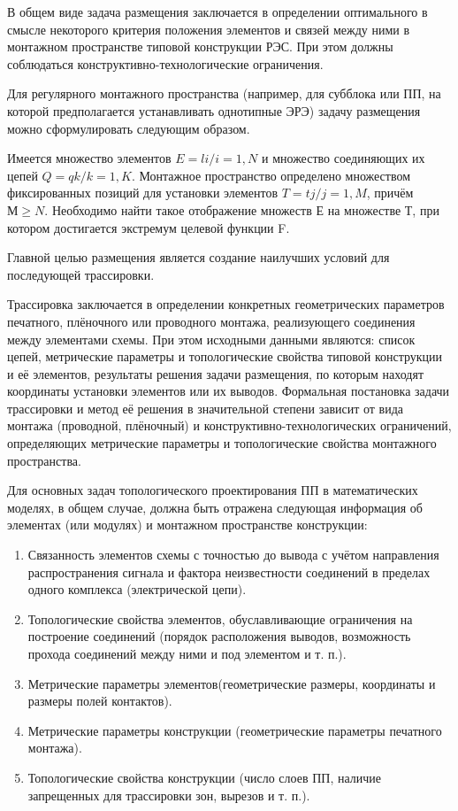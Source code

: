 \documentclass[a4paper,14pt]{article}
\begin{document}
В общем виде задача размещения заключается в определении оптимального в смысле некоторого критерия положения элементов и связей между ними в монтажном пространстве типовой конструкции РЭС. При этом должны соблюдаться конструктивно-технологические ограничения.

Для регулярного монтажного пространства (например, для субблока или ПП, на которой предполагается устанавливать однотипные ЭРЭ) задачу размещения можно сформулировать следующим образом.

Имеется множество элементов $E= {li / i=1, N}$ и множество соединяющих их цепей $Q= {qk/ k=1, K}$. Монтажное пространство определено множеством фиксированных позиций для установки элементов $T= {tj / j=1, M}$, причём $М ≥ N$. Необходимо найти такое отображение множеств Е на множестве Т, при котором достигается экстремум целевой функции F.


Главной целью размещения является создание наилучших условий для последующей трассировки.

Трассировка заключается в определении конкретных геометрических параметров печатного, плёночного или проводного монтажа, реализующего соединения между элементами схемы. При этом исходными данными являются: список цепей, метрические параметры и топологические свойства типовой конструкции и её элементов, результаты решения задачи размещения, по которым находят координаты установки элементов или их выводов. Формальная постановка задачи трассировки и метод её решения в значительной степени зависит от вида монтажа (проводной, плёночный) и конструктивно-технологических ограничений, определяющих метрические параметры и топологические свойства монтажного пространства.

Для основных задач топологического проектирования ПП в математических моделях, в общем случае, должна быть отражена следующая информация об элементах (или модулях) и монтажном пространстве конструкции:

\begin{enumerate}
	\item Связанность  элементов  схемы  с  точностью  до  вывода  с  учётом направления  распространения  сигнала  и  фактора  неизвестности  соединений  в  
	пределах одного комплекса (электрической цепи).
	
	\item Топологические свойства элементов, обуславливающие ограничения на построение соединений (порядок расположения выводов, возможность прохода соединений между ними и под элементом и т. п.).
	
	\item Метрические   параметры   элементов(геометрические   размеры, координаты и размеры полей контактов).
	
	\item Метрические параметры конструкции (геометрические параметры печатного монтажа).
	
	\item Топологические свойства конструкции (число слоев ПП, наличие запрещенных для трассировки зон, вырезов и т. п.).
\end{enumerate}
\end{document}
